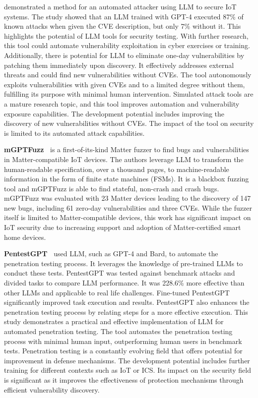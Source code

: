 \smallskip
\noindent \textbf{\citet{fang2024llm}} demonstrated a method for an automated attacker using LLM to secure IoT systems.
The study showed that an LLM trained with GPT-4 executed 87\% of known attacks when given the CVE description, but only 7\% without it.
This highlights the potential of LLM tools for security testing.
With further research, this tool could automate vulnerability exploitation in cyber exercises or training.
Additionally, there is potential for LLM to eliminate one-day vulnerabilities by patching them immediately upon discovery.
It effectively addresses external threats and could find new vulnerabilities without CVEs.
The tool autonomously exploits vulnerabilities with given CVEs and to a limited degree without them, fulfilling its purpose with minimal human intervention.
Simulated attack tools are a mature research topic, and this tool improves automation and vulnerability exposure capabilities.
The development potential includes improving the discovery of new vulnerabilities without CVEs.
The impact of the tool on security is limited to its automated attack capabilities.

\smallskip
\noindent \textbf{mGPTFuzz~\cite{Maetal2024}} is a first-of-its-kind Matter fuzzer to find bugs and vulnerabilities in Matter-compatible IoT devices.
The authors leverage LLM to transform the human-readable specification, over a thousand pages, to machine-readable information in the form of finite state machines (FSMs).
It is a blackbox fuzzing tool and mGPTFuzz is able to find stateful, non-crash and crash bugs.
mGPTFuzz was evaluated with 23 Matter devices leading to the discovery of 147 new bugs, including 61 zero-day vulnerabilities and three CVEs.
While the fuzzer itself is limited to Matter-compatible devices, this work has significant impact on IoT security due to increasing support and adoption of Matter-certified smart home devices.

\smallskip
\noindent \textbf{PentestGPT~\citet{deng2023pentestgpt}} used LLM, such as GPT-4 and Bard, to automate the penetration testing process.
It leverages the knowledge of pre-trained LLMs to conduct these tests.
PentestGPT was tested against benchmark attacks and divided tasks to compare LLM performance.
It was 228.6\% more effective than other LLMs and applicable to real life challenges.
Fine-tuned PentestGPT significantly improved task execution and results.
PentestGPT also enhances the penetration testing process by relating steps for a more effective execution.
This study demonstrates a practical and effective implementation of LLM for automated penetration testing.
The tool automates the penetration testing process with minimal human input, outperforming human users in benchmark tests.
Penetration testing is a constantly evolving field that offers potential for improvement in defense mechanisms.
The development potential includes further training for different contexts such as IoT or ICS.
Its impact on the security field is significant as it improves the effectiveness of protection mechanisms through efficient vulnerability discovery.

